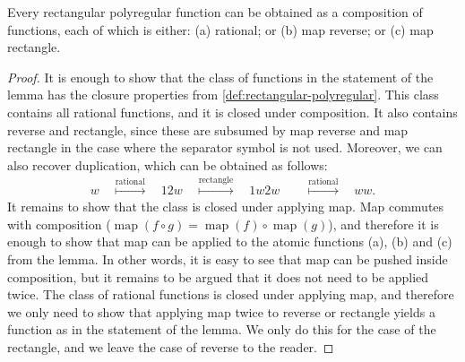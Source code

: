 \documentclass[a4paper,UKenglish,cleveref, autoref, thm-restate]{lipics-v2021}
\begin{document}
            \begin{lemma}\label{lem:map-normal-form}
                Every rectangular polyregular function can be obtained as a composition of functions, each of which is either: (a) rational; or (b) map reverse; or (c) map rectangle.  
    \end{lemma}
    \begin{proof}
        It is enough to show that the class of functions in the statement of the lemma has the  closure properties from \cref{def:rectangular-polyregular}. This class contains all rational functions, and it is closed under composition. It also contains reverse and rectangle, since these are subsumed by map reverse and map rectangle in the case where the separator symbol is not used. 
      Moreover, we can also recover duplication, which can be obtained as follows: 
        \begin{align*}
        w 
        \quad \stackrel{\text{rational}}\mapsto \quad 
        12w 
        \quad \stackrel{\text{rectangle}}\mapsto \quad 
1w2w 
        \qquad \stackrel{\text{rational}}\mapsto \quad   ww.
        \end{align*}
        It remains to show that the class is closed under applying map. Map commutes with composition ($\mathop{map}(f \circ g) =
        \mathop{map}(f) \circ \mathop{map}(g)$), and therefore it is enough to show that map can be applied to the atomic functions (a), (b) and (c) from the lemma. In other words, it is easy to see that map can be pushed inside composition, but it remains to be argued that it does not need to be applied twice.  The class of rational functions is closed under applying map, and therefore we only need to show that applying map twice to reverse or rectangle  yields  a function as in the statement of the lemma. We only do this for the case of the rectangle, and we leave the case of reverse to the reader.  
        

\end{proof}
\end{document}
